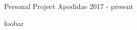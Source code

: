 
\begin{cventries}
	\cventry
		{Personal Project}
		{Apodidae}
		{}
		{2017 - present}
		{
			\begin{cvitems}
				\item {foobar}
			\end{cvitems}
		}
\end{cventries}